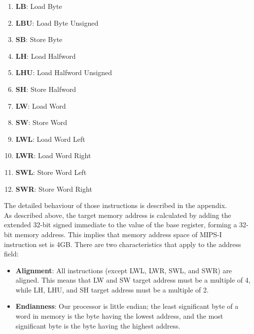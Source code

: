 \documentclass[oneside]{book}
\begin{document}
\begin{enumerate}

\item \textbf{LB}:  Load Byte
\item \textbf{LBU}: Load Byte Unsigned
\item \textbf{SB}:  Store Byte
\item \textbf{LH}:  Load Halfword
\item \textbf{LHU}: Load Halfword Unsigned
\item \textbf{SH}:  Store Halfword
\item \textbf{LW}:  Load Word
\item \textbf{SW}:  Store Word
\item \textbf{LWL}: Load Word Left
\item \textbf{LWR}: Load Word Right
\item \textbf{SWL}: Store Word Left
\item \textbf{SWR}: Store Word Right

\end{enumerate}

The detailed behaviour of those instructions is described
in the appendix.\\

As described above, the target memory address is calculated by
adding the extended 32-bit signed immediate to the value of
the base register, forming a 32-bit memory address. This implies
that memory address space of MIPS-I instruction set is 4GB. There
are two characteristics that apply to the address field:

\begin{itemize}

\item \textbf{Alignment}: All instructions (except LWL, LWR, SWL,
                          and SWR) are aligned. This means that
                          LW and SW target address must be
                          a multiple of 4, while LH, LHU, and
                          SH target address must be a multiple of 2.

\item \textbf{Endianness}: Our processor is little endian; the least
                           significant byte of a word in memory is the
                           byte having the lowest address, and the
                           most significant byte is the byte having
                           the highest address.

\end{itemize}
\end{document}
